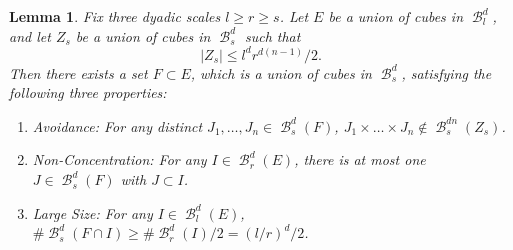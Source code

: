 \documentclass[dvipsnames,letterpaper,12pt]{article}
\numberwithin{equation}{section}
\theoremstyle{plain}
\newtheorem{lemma}{Lemma}
\DeclareMathOperator{\B}{\mathcal{B}}
\begin{document}
\begin{lemma} \label{discretelemma}
	Fix three dyadic scales $l \geq r \geq s$. Let $E$ be a union of cubes in $\B^d_l$, and let $Z_s$ be a union of cubes in $\B^d_s$ such that
	\begin{equation}\label{discretelemmahypothesis}
		|Z_s| \leq l^d r^{d(n-1)}/2.
	\end{equation}
	Then there exists a set $F \subset E$, which is a union of cubes in $\B^d_s$, satisfying the following three properties:
	\begin{enumerate}
		\item\label{avoidanceItem} \emph{Avoidance}: For any distinct $J_1, \dots, J_n \in \B^d_s(F)$, $J_1 \times \dots \times J_n \not \in \B_s^{dn}(Z_s)$.
		\item\label{nonConcentrationItem} \emph{Non-Concentration}: For any $I \in \B_r^d(E)$, there is at most one $J \in \B_s^d(F)$ with $J \subset I$.
		\item\label{largeSizeItem} \emph{Large Size}: For any $I \in \B^d_l(E)$, $\# \B^d_s(F \cap I) \geq \# \B^d_r(I) / 2 = (l/r)^d / 2$.
	\end{enumerate}
\end{lemma}
\end{document}
